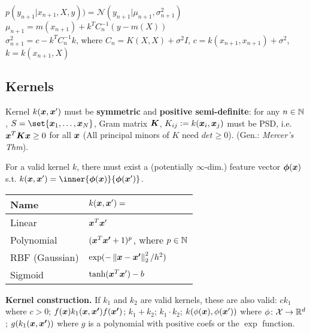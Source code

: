     $p(y_{n+1}|x_{n+1}, X, y)) = \mathcal{N}(y_{n+1} | \mu_{n+1}, \sigma^2_{n+1})$	\\
    $\mu_{n+1} = m(x_{n+1})+k^T C^{-1}_n (y\!-\!m(X))$ \\
    $\sigma^2_{n+1} = c - k^T C^{-1}_n k$, where $C_n = K(X,X) + \sigma^2 I$, $c = k(x_{n+1},x_{n+1})\!+\!\sigma^2$, $k = k(x_{n+1}, X)$ \\

\subsection*{Kernels}

    Kernel $k(\boldsymbol{x}, \boldsymbol{x}')$ must be \textbf{symmetric} and \textbf{positive semi-definite}: for any $n \in \mathbb{N}$, $S = \set{\b{x}_1, \ldots, \b{x}_N}$, Gram matrix $\boldsymbol{K}$, $K_{ij} \vcentcolon= k(\boldsymbol{x}_i, \boldsymbol{x}_j)$ must be PSD, i.e. $\boldsymbol{x}^T\boldsymbol{K}\boldsymbol{x} \geq 0$ for all $\boldsymbol{x}$ (All principal minors of $K$ need $det \geq 0$). (Gen.: \textit{Mercer's Thm}).


    For a valid kernel $k$, there must exist a (potentially $\infty$-dim.) feature vector $\boldsymbol{\phi}(\boldsymbol{x})$ s.t. $k(\b{x}, \b{x}') = \inner{\b{\phi}(\b{x})}{\b{\phi}(\b{x}')}$.
    
    \begin{tabular}{ll}
    \hline
    \textbf{Name} & $k(\boldsymbol{x}, \boldsymbol{x}') = $ \\
    \hline
    Linear & $\boldsymbol{x}^T \boldsymbol{x}'$ \\
    Polynomial & $(\boldsymbol{x}^T\boldsymbol{x'} + 1)^p$, where $p \in \mathbb{N}$ \\
    RBF (Gaussian) & $\exp(-\left\lVert\boldsymbol{x} - \boldsymbol{x'}\right\rVert_2^2 / h^2)$ \\
    Sigmoid & $\tanh(\boldsymbol{x}^T \boldsymbol{x}') - b$ 
    \\
    \hline
    \end{tabular}

    \textbf{Kernel construction.} If $k_1$ and $k_2$ are valid kernels, these are also valid:
    $ck_1$ where $c > 0$;
    $f(\boldsymbol{x}) k_1(\boldsymbol{x}, \boldsymbol{x'}) f(\boldsymbol{x'})$;
    $k_1 + k_2$; $k_1 \cdot k_2$;
    $k(\phi(\boldsymbol{x}), \phi(\boldsymbol{x}'))$ where $\phi \colon \mathcal{X} \rightarrow \mathbb R^d$;
    $g(k_1(\boldsymbol{x}, \boldsymbol{x'}))$ where $g$ is a polynomial with positive coefs or the $\exp$ function.

	

